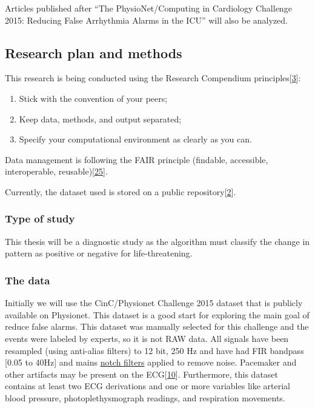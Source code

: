 \documentclass[
]{article}
\providecommand{\tightlist}{%
  \setlength{\itemsep}{0pt}\setlength{\parskip}{0pt}}
\begin{document}
Articles published after ``The PhysioNet/Computing in Cardiology
Challenge 2015: Reducing False Arrhythmia Alarms in the ICU'' will also
be analyzed.

\hypertarget{research-plan-and-methods}{%
\subsection{Research plan and methods}\label{research-plan-and-methods}}

This research is being conducted using the Research Compendium
principles{[}\protect\hyperlink{ref-compendium2019}{3}{]}:

\begin{enumerate}
\def\labelenumi{\arabic{enumi}.}
\tightlist
\item
  Stick with the convention of your peers;
\item
  Keep data, methods, and output separated;
\item
  Specify your computational environment as clearly as you can.
\end{enumerate}

Data management is following the FAIR principle (findable, accessible,
interoperable, reusable){[}\protect\hyperlink{ref-wilkinson2016}{25}{]}.

Currently, the dataset used is stored on a public
repository{[}\protect\hyperlink{ref-franz_website}{2}{]}.

\hypertarget{type-of-study}{%
\subsubsection{Type of study}\label{type-of-study}}

This thesis will be a diagnostic study as the algorithm must classify
the change in pattern as positive or negative for life-threatening.

\hypertarget{the-data}{%
\subsubsection{The data}\label{the-data}}

Initially we will use the CinC/Physionet Challenge 2015 dataset that is
publicly available on Physionet. This dataset is a good start for
exploring the main goal of reduce false alarms. This dataset was
manually selected for this challenge and the events were labeled by
experts, so it is not RAW data. All signals have been resampled (using
anti-alias filters) to 12 bit, 250 Hz and have had FIR bandpass {[}0.05
to 40Hz{]} and mains
\href{https://www.sciencedirect.com/topics/engineering/notch-filters}{notch
filters} applied to remove noise. Pacemaker and other artifacts may be
present on the ECG{[}\protect\hyperlink{ref-Clifford2015}{10}{]}.
Furthermore, this dataset contains at least two ECG derivations and one
or more variables like arterial blood pressure, photoplethysmograph
readings, and respiration movements.
\end{document}
